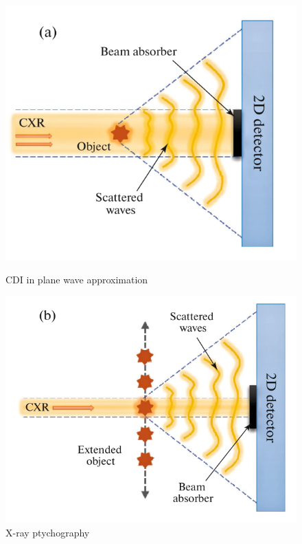 \documentclass{article}
\begin{document}
\begin{figure}[h!]
    \begin{minipage}{0.5\textwidth}
        \includegraphics[width=\textwidth]{plane_wave_approximation.png}
        \caption{CDI in plane wave approximation}
    \end{minipage}%
    \begin{minipage}{0.5\textwidth}
        \includegraphics[width=\textwidth]{ptychography.png}
        \caption{X-ray ptychography}
    \end{minipage}


\end{figure}
\end{document}
